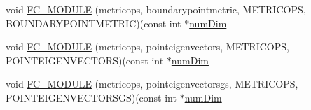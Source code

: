 \begin{DoxyCompactItemize}
\item 
void \hyperlink{MetricKernels_8H_a9b6ec6b78911c1be1561415d0fe202b5}{F\+C\+\_\+\+M\+O\+D\+U\+LE} (metricops, boundarypointmetric, M\+E\+T\+R\+I\+C\+O\+PS, B\+O\+U\+N\+D\+A\+R\+Y\+P\+O\+I\+N\+T\+M\+E\+T\+R\+IC)(const int $\ast$\hyperlink{SATKernels_8H_a680185db8546de161968dabace9e94f1}{num\+Dim}
\item 
void \hyperlink{MetricKernels_8H_aa470387062782151350ab4f7d1d79aa9}{F\+C\+\_\+\+M\+O\+D\+U\+LE} (metricops, pointeigenvectors, M\+E\+T\+R\+I\+C\+O\+PS, P\+O\+I\+N\+T\+E\+I\+G\+E\+N\+V\+E\+C\+T\+O\+RS)(const int $\ast$\hyperlink{SATKernels_8H_a680185db8546de161968dabace9e94f1}{num\+Dim}
\item 
void \hyperlink{MetricKernels_8H_a430b5fdc23ceede4fabf0b0fb1a9a4ea}{F\+C\+\_\+\+M\+O\+D\+U\+LE} (metricops, pointeigenvectorsgs, M\+E\+T\+R\+I\+C\+O\+PS, P\+O\+I\+N\+T\+E\+I\+G\+E\+N\+V\+E\+C\+T\+O\+R\+S\+GS)(const int $\ast$\hyperlink{SATKernels_8H_a680185db8546de161968dabace9e94f1}{num\+Dim}
\end{DoxyCompactItemize}
